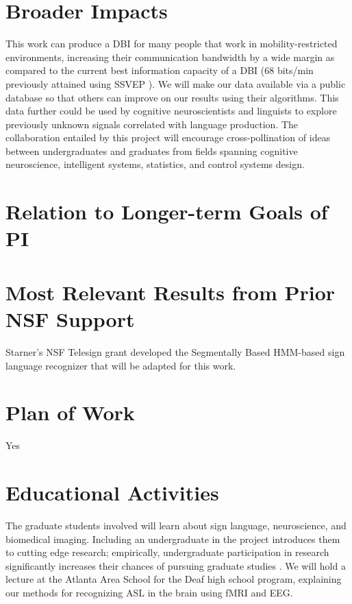 \documentclass{proposal}
\begin{document}
\section{Broader Impacts}

This work can produce a DBI for many people that work in mobility-restricted environments, increasing their communication bandwidth by a wide margin as compared to the current best information capacity of a DBI (68 bits/min previously attained using SSVEP \cite{gao2003bbe}). We will make our data available via a public database so that others can improve on our results using their algorithms. This data further could be used by cognitive neuroscientists and linguists to explore previously unknown signals correlated with language production. The collaboration entailed by this project will encourage cross-pollination of ideas between undergraduates and graduates from fields spanning cognitive neuroscience, intelligent systems, statistics, and control systems design.


\section{Relation to Longer-term Goals of PI}

\section{Most Relevant Results from Prior NSF Support}

Starner's NSF Telesign grant developed the Segmentally Based HMM-based sign language recognizer that will be adapted for this work.


\section{Plan of Work}

Yes


\section{Educational Activities}

The graduate students involved will learn about sign language, neuroscience, and biomedical imaging. Including an undergraduate in the project introduces them to cutting edge research; empirically, undergraduate participation in research significantly increases their chances of pursuing graduate studies \cite{hathaway2002rur}. We will hold a lecture at the Atlanta Area School for the Deaf high school program, explaining our methods for recognizing ASL in the brain using fMRI and EEG.




\end{document}
